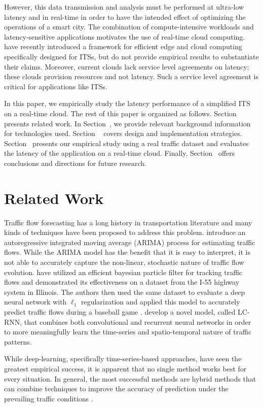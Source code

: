 \documentclass{article}
\newcommand{\RNum}[1]{\uppercase\expandafter{\romannumeral #1\relax}}
\begin{document}
However, this data transmission and analysis must be performed at ultra-low latency and in real-time in order to have the intended effect of optimizing the operations of a smart city. The combination of compute-intensive workloads and latency-sensitive applications motivates the use of real-time cloud computing. \citep{edge} have recently introduced a framework for efficient edge and cloud computing specifically designed for ITSs, but do not provide empirical results to substantiate their claims. Moreover, current clouds lack service level agreements on latency; these clouds provision resources and not latency. Such a service level agreement is critical for applications like ITSs.

In this paper, we empirically study the latency performance of a simplified ITS on a real-time cloud. The rest of this paper is organized as follows. Section~\RNum{2} presents related work. In Section~\RNum{3}, we provide relevant background information for technologies used. Section ~\RNum{4} covers design and implementation strategies. Section~\RNum{5} presents our empirical study using a real traffic dataset and evaluates the latency of the application on a real-time cloud. Finally, Section~\RNum{6} offers conclusions and directions for future research.
\section{Related Work}
 Traffic flow forecasting has a long history in transportation literature and many kinds of techniques have been proposed to address this problem. \citep{modeling} introduce an autoregressive integrated moving average (ARIMA) process for estimating traffic flows. While the ARIMA model has the benefit that it is easy to interpret, it is not able to accurately capture the non-linear, stochastic nature of traffic flow evolution. \citep{bayesian} have utilized an efficient bayesian particle filter for tracking traffic flows and demonstrated its effectiveness on a dataset from the I-55 highway system in Illinois. The authors then used the same dataset to evaluate a deep neural network with $\ell_{1}$ regularization and applied this model to accurately predict traffic flows during a baseball game \citep{chicago}. \citep{lcrnn} develop a novel model, called LC-RNN, that combines both convolutional and recurrent neural networks in order to more meaningfully learn the time-series and spatio-temporal nature of traffic patterns. 

While deep-learning, specifically time-series-based approaches, have seen the greatest empirical success, it is apparent that no single method works best for every situation.  In general, the most successful methods are hybrid methods that can combine techniques to improve the accuracy of prediction under the prevailing traffic conditions \citep{DBLP:journals/corr/abs-1709-08024}. 
\end{document}
